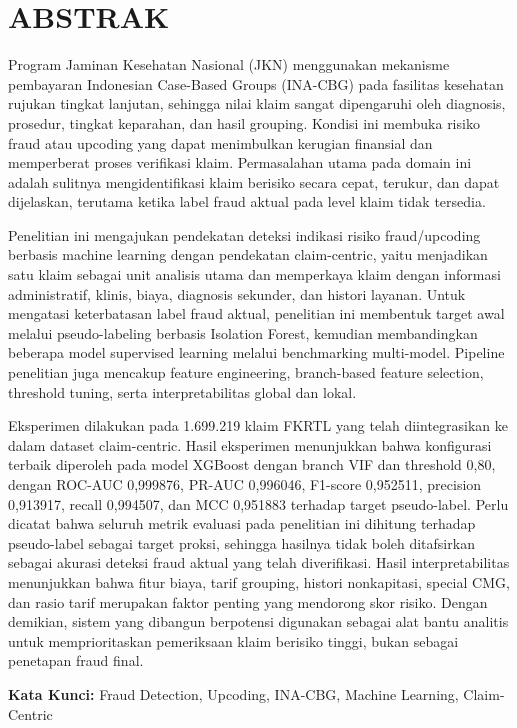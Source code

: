 \cleardoublepage
\chapter*{ABSTRAK}
\thispagestyle{fancy}

Program Jaminan Kesehatan Nasional (JKN) menggunakan mekanisme pembayaran Indonesian Case-Based Groups (INA-CBG) pada fasilitas kesehatan rujukan tingkat lanjutan, sehingga nilai klaim sangat dipengaruhi oleh diagnosis, prosedur, tingkat keparahan, dan hasil grouping. Kondisi ini membuka risiko fraud atau upcoding yang dapat menimbulkan kerugian finansial dan memperberat proses verifikasi klaim. Permasalahan utama pada domain ini adalah sulitnya mengidentifikasi klaim berisiko secara cepat, terukur, dan dapat dijelaskan, terutama ketika label fraud aktual pada level klaim tidak tersedia.

Penelitian ini mengajukan pendekatan deteksi indikasi risiko fraud/upcoding berbasis machine learning dengan pendekatan claim-centric, yaitu menjadikan satu klaim sebagai unit analisis utama dan memperkaya klaim dengan informasi administratif, klinis, biaya, diagnosis sekunder, dan histori layanan. Untuk mengatasi keterbatasan label fraud aktual, penelitian ini membentuk target awal melalui pseudo-labeling berbasis Isolation Forest, kemudian membandingkan beberapa model supervised learning melalui benchmarking multi-model. Pipeline penelitian juga mencakup feature engineering, branch-based feature selection, threshold tuning, serta interpretabilitas global dan lokal.

Eksperimen dilakukan pada 1.699.219 klaim FKRTL yang telah diintegrasikan ke dalam dataset claim-centric. Hasil eksperimen menunjukkan bahwa konfigurasi terbaik diperoleh pada model XGBoost dengan branch VIF dan threshold 0,80, dengan ROC-AUC 0,999876, PR-AUC 0,996046, F1-score 0,952511, precision 0,913917, recall 0,994507, dan MCC 0,951883 terhadap target pseudo-label. Perlu dicatat bahwa seluruh metrik evaluasi pada penelitian ini dihitung terhadap pseudo-label sebagai target proksi, sehingga hasilnya tidak boleh ditafsirkan sebagai akurasi deteksi fraud aktual yang telah diverifikasi. Hasil interpretabilitas menunjukkan bahwa fitur biaya, tarif grouping, histori nonkapitasi, special CMG, dan rasio tarif merupakan faktor penting yang mendorong skor risiko. Dengan demikian, sistem yang dibangun berpotensi digunakan sebagai alat bantu analitis untuk memprioritaskan pemeriksaan klaim berisiko tinggi, bukan sebagai penetapan fraud final.

\vspace{1cm}
\noindent\textbf{Kata Kunci:} Fraud Detection, Upcoding, INA-CBG, Machine Learning, Claim-Centric
